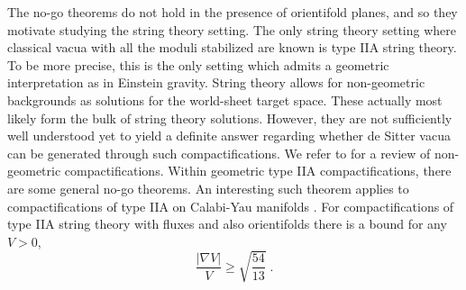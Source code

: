 \documentclass[11pt,a4paper]{article}
\numberwithin{equation}{section}
\numberwithin{table}{section}\setlength{\multlinegap}{25pt}
\newcommand{\be}{\begin{equation}}
\newcommand{\ee}{\end{equation}}
\begin{document}
{The no-go theorems do not hold in the presence of orientifold planes, and so they motivate studying the string theory setting. The only string theory setting where classical vacua with all the moduli stabilized are known is type IIA string theory. To be more precise, this is the only setting which admits a geometric interpretation as in Einstein gravity. String theory allows for non-geometric backgrounds as solutions for the world-sheet target space. These actually most likely form the bulk of string theory solutions. However, they are not sufficiently well understood yet to yield a definite answer regarding whether de Sitter vacua can be generated through such compactifications. We refer to \cite{Plauschinn:2018wbo} for a review of non-geometric compactifications. Within geometric type IIA compactifications, there are some general no-go theorems. An interesting such theorem applies to compactifications of type IIA on Calabi-Yau manifolds \cite{Hertzberg:2007wc}. For compactifications of type IIA string theory with fluxes and also orientifolds there is a bound for any $V>0$, 
\be
\frac{\left|\nabla V \right|}{V} \geq \sqrt{\frac{54}{13}} \;.
\label{CYiianogo}
\ee

}
\end{document}
